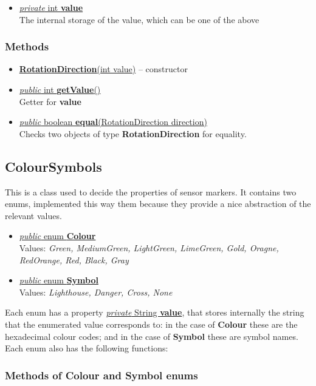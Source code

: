 \documentclass{article}
\newcommand{\method}[4]{\underline{\textit{#1} #2 \textbf{#3}(#4)}}
\newcommand{\prop}[3]{\underline{\textit{#1} #2 \textbf{#3}}}
\begin{document}
\begin{itemize}
\item \prop{private}{int}{value} \\
  The internal storage of the value, which can be one of the above
\end{itemize}

\subsubsection*{Methods}

\begin{itemize}
\item \underline{\textbf{RotationDirection}(int value)} -- constructor
\item \method{public}{int}{getValue}{} \\
  Getter for \textbf{value}
\item \method{public}{boolean}{equal}{RotationDirection direction} \\
  Checks two objects of type \textbf{RotationDirection} for equality.
\end{itemize}

\subsection{ColourSymbols}
\label{cls:ColoursSymbols}

This is a class used to decide the properties of sensor markers. It contains two enums, implemented this way them because they provide a nice abstraction of the relevant values.

\begin{itemize}
\item \prop{public}{enum}{Colour} \\
  Values: \textit{Green, MediumGreen, LightGreen, LimeGreen, Gold, Oragne, RedOrange, Red, Black, Gray}
\item \prop{public}{enum}{Symbol} \\
  Values: \textit{Lighthouse, Danger, Cross, None}
\end{itemize}

Each enum has a property \prop{private}{String}{value}, that stores internally the string that the enumerated value corresponds to: in the case of \textbf{Colour} these are the hexadecimal colour codes; and in the case of \textbf{Symbol} these are symbol names. Each enum also has the following functions:

\subsubsection*{Methods of Colour and Symbol enums}
\end{document}
